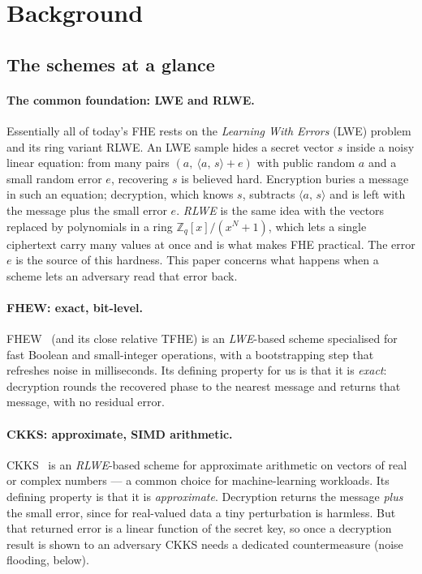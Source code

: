 \documentclass[11pt]{article}
\newcommand{\inner}[2]{\langle #1,\, #2\rangle}
\newcommand{\Z}{\mathbb{Z}}
\begin{document}
\section{Background}

\subsection{The schemes at a glance}
\label{sec:glance}

\paragraph{The common foundation: LWE and RLWE.}
Essentially all of today's FHE rests on the \emph{Learning With Errors} (LWE) problem and its ring
variant RLWE. An LWE sample hides a secret vector $s$ inside a noisy linear equation: from many
pairs $(a,\ \inner{a}{s} + e)$ with public random $a$ and a small random error $e$, recovering $s$
is believed hard. Encryption buries a message in such an equation; decryption, which knows $s$,
subtracts $\inner{a}{s}$ and is left with the message plus the small error $e$. \emph{RLWE} is the
same idea with the vectors replaced by polynomials in a ring $\Z_q[x]/(x^N+1)$, which lets a single
ciphertext carry many values at once and is what makes FHE practical. The error $e$ is the source of this hardness. This paper concerns what happens when a scheme lets an adversary read that error back.

\paragraph{FHEW: exact, bit-level.}
FHEW~\cite{ducas2015} (and its close relative TFHE) is an \emph{LWE}-based scheme specialised for
fast Boolean and small-integer operations, with a bootstrapping step that refreshes noise in
milliseconds. Its defining property for us is that it is \emph{exact}: decryption rounds the
recovered phase to the nearest message and returns that message, with no residual error.

\paragraph{CKKS: approximate, SIMD arithmetic.}
CKKS~\cite{cheon2017} is an \emph{RLWE}-based scheme for approximate arithmetic on vectors of real
or complex numbers --- a common choice for machine-learning workloads. Its defining
property is that it is \emph{approximate}. Decryption returns the message \emph{plus} the small
error, since for real-valued data a tiny perturbation is harmless. But that returned error is a
linear function of the secret key, so once a decryption result is shown to an adversary CKKS needs
a dedicated countermeasure (noise flooding, below).
\end{document}
